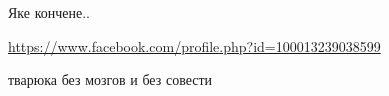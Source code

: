 \begin{itemize}

 
Яке кончене..

\url{https://www.facebook.com/profile.php?id=100013239038599}\par
 
тварюка без мозгов и без совести

\end{itemize} %
